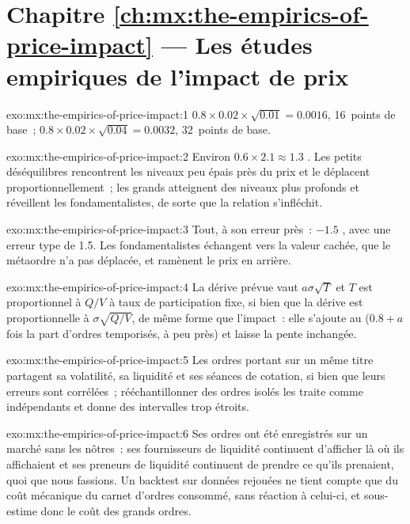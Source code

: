 \section*{Chapitre \ref{ch:mx:the-empirics-of-price-impact} --- Les études empiriques de l'impact de prix}

\begin{solution}{exo:mx:the-empirics-of-price-impact:1}
$0.8\times0.02\times\sqrt{0.01}=0.0016$, 16~points de base~; $0.8\times0.02\times\sqrt{0.04}=0.0032$, 32~points de base.
\end{solution}

\begin{solution}{exo:mx:the-empirics-of-price-impact:2}
Environ $0.6\times2.1\approx1.3$ . Les petits déséquilibres rencontrent les niveaux peu épais près du prix et le déplacent proportionnellement~; les grands atteignent des niveaux plus profonds et
réveillent les fondamentalistes, de sorte que la relation s'infléchit.
\end{solution}

\begin{solution}{exo:mx:the-empirics-of-price-impact:3}
Tout, à son erreur près~: $-1.5$ , avec une erreur type de 1.5. Les fondamentalistes échangent vers la valeur cachée, que le métaordre n'a pas
déplacée, et ramènent le prix en arrière.
\end{solution}

\begin{solution}{exo:mx:the-empirics-of-price-impact:4}
La dérive prévue vaut $a\sigma\sqrt T$ et $T$ est proportionnel à $Q/V$ à taux de participation fixe, si bien que la dérive est proportionnelle à $\sigma\sqrt{Q/V}$,
de même forme que l'impact~: elle s'ajoute au  ($0.8+a$ fois la part d'ordres temporisés, à peu près) et laisse la pente inchangée.
\end{solution}

\begin{solution}{exo:mx:the-empirics-of-price-impact:5}
Les ordres portant sur un même titre partagent sa volatilité, sa liquidité et ses séances de cotation, si bien que leurs erreurs sont corrélées~; rééchantillonner des ordres isolés les traite comme indépendants
et donne des intervalles trop étroits.
\end{solution}

\begin{solution}{exo:mx:the-empirics-of-price-impact:6}
Ses ordres ont été enregistrés sur un marché sans les nôtres~: ses fournisseurs de liquidité continuent d'afficher là où ils affichaient et ses preneurs de liquidité continuent de prendre ce qu'ils prenaient, quoi que
nous fassions. Un backtest sur données rejouées ne tient compte que du coût mécanique du carnet d'ordres consommé, sans réaction à celui-ci, et sous-estime donc le coût des grands ordres.
\end{solution}


